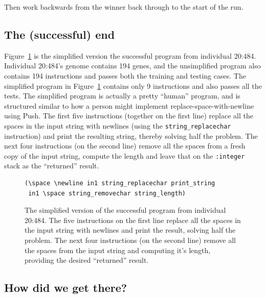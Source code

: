 Then work backwards from the winner back through to the start of the run.

\subsection{The (successful) end}

Figure~\ref{prog:simplified20:484} 
is the simplified version the successful program from 
individual 20:484. Individual 20:484's genome contains 194 genes, and the unsimplified 
program also contains 194 instructions and passes both
the training and testing cases. The simplified program in 
Figure~\ref{prog:simplified20:484} contains only 9 instructions and
also passes all the tests. 
The simplified program is actually a pretty ``human'' program, and is structured similar to 
how a person might implement replace-space-with-newline using Push. The first five 
instructions (together on the first line) replace all the spaces in the input string 
with newlines (using the \texttt{string\_replacechar} instruction) and print the 
resulting string, thereby solving half the problem. 
The next four instructions (on the second line) remove all the spaces from
a fresh copy of the input string, compute the length and leave that on the
\texttt{:integer} stack as the ``returned'' result.

\begin{figure}[h]
\begin{verbatim}
(\space \newline in1 string_replacechar print_string
 in1 \space string_removechar string_length)
\end{verbatim}
\caption{The simplified version of the successful program from individual 20:484. The
	five instructions on the first line replace all the spaces in the input string with newlines
	and print the result, solving half the problem. The next four instructions (on the second
	line) remove all the spaces from the input string and computing it's length, providing
	the desired ``returned'' result.}
\label{prog:simplified20:484}
\end{figure}

\subsection{How did we get there?}

